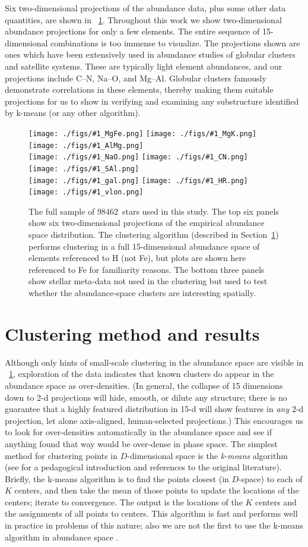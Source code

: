 \documentclass[12pt, letterpaper, preprint]{aastex}
\newcommand{\sectionname}{Section}
\newcommand{\insanefigure}[1]{%
\texttt{[image: ./figs/\#1\_MgFe.png]}%
\texttt{[image: ./figs/\#1\_MgK.png]}%
\texttt{[image: ./figs/\#1\_AlMg.png]}\\
\texttt{[image: ./figs/\#1\_NaO.png]}%
\texttt{[image: ./figs/\#1\_CN.png]}%
\texttt{[image: ./figs/\#1\_SAl.png]}\\
\texttt{[image: ./figs/\#1\_gal.png]}%
\texttt{[image: ./figs/\#1\_HR.png]}\\
\texttt{[image: ./figs/\#1\_vlon.png]}}
\newcommand{\totalnumber}{98462}
\begin{document}
Six two-dimensional projections of the abundance data, plus some other
data quantities, are shown in \figurename~\ref{fig:all}.  Throughout
this work we show two-dimensional abundance projections for only a few
elements. The entire sequence of 15-dimensional combinations is too
immense to visualize. The projections shown are ones which
have been extensively used in abundance studies of globular clusters
and satellite systems. These are typically light element abundances,
and our projections include C--N, Na--O, and Mg--Al. Globular clusters
famously demonstrate correlations in these elements, thereby making
them suitable projections for us to show in verifying and examining
any substructure identified by k-means (or any other algorithm).

\begin{figure}[!p]
\insanefigure{all}
\caption{The full sample of \totalnumber\ stars used in this study.
  The top six panels show six two-dimensional projections of the
  empirical abundance space distribution.
  The clustering algorithm (described in
  \sectionname~\ref{sec:method}) performs clustering in a full
  15-dimensional abundance space of elements referenced to H (not Fe),
  but plots are shown here referenced to Fe for familiarity reasons.
  The bottom three panels show stellar meta-data not used in the
  clustering but used to test whether the abundance-space clusters
  are interesting spatially.\label{fig:all}}
\end{figure}

\clearpage
\section{Clustering method and results}\label{sec:method}

Although only hints of small-scale clustering in the abundance space
are visible in \figurename~\ref{fig:all}, exploration of the data indicates that
known clusters do appear in the abundance space as over-densities.
(In general, the collapse of 15 dimensions down to 2-d projections
will hide, smooth, or dilute any structure; there is no guarantee that
a highly featured distribution in 15-d will show features in
\emph{any} 2-d projection, let alone axis-aligned, human-selected projections.)
This encourages us to look for over-densities automatically in the
abundance space and see if anything found that way would be over-dense
in phase space.
The simplest method for clustering points in $D$-dimensional space is
the \emph{k-means} algorithm (see \citealt{bishop} for a pedagogical
introduction and references to the original literature).
Briefly, the k-means algorithm is to find the points closest (in
$D$-space) to each of $K$ centers, and then take the mean of those
points to update the locations of the centers; iterate to convergence.
The output is the locations of the $K$ centers and the assignments of
all points to centers.
This algorithm is fast and performs well in practice in problems of
this nature; also we are not the first to use the k-means algorithm in
abundance space \citep{gratton}.
\end{document}
